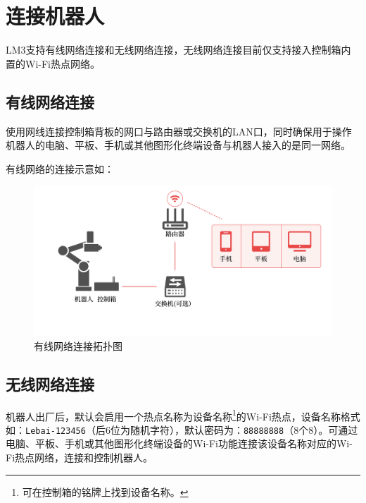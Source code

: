 
\clearpage

\section{连接机器人}
LM3支持有线网络连接和无线网络连接，无线网络连接目前仅支持接入控制箱内置的Wi-Fi热点网络。
\subsection{有线网络连接}

使用网线连接控制箱背板的网口与路由器或交换机的LAN口，同时确保用于操作机器人的电脑、平板、手机或其他图形化终端设备与机器人接入的是同一网络。

有线网络的连接示意如：

\begin{figure}[ht]
    \centering
    \includegraphics[width=\textwidth]{image/network-1.pdf}
    \caption{有线网络连接拓扑图}
    \label{fig:有线网络连接拓扑图}
\end{figure}

\clearpage

\subsection{无线网络连接}
机器人出厂后，默认会启用一个热点名称为设备名称\footnote{可在控制箱的铭牌上找到设备名称。}的Wi-Fi热点，设备名称格式如：\verb|Lebai-123456|（后6位为随机字符），默认密码为：\verb|88888888|（8个8）。可通过电脑、平板、手机或其他图形化终端设备的Wi-Fi功能连接该设备名称对应的Wi-Fi热点网络，连接和控制机器人。


